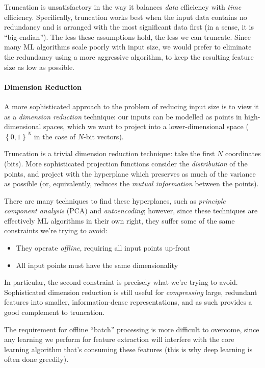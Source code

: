 \documentclass[]{article}
\begin{document}
Truncation is unsatisfactory in the way it balances \emph{data} efficiency with \emph{time} efficiency. Specifically, truncation works best when the input data contains no redundancy and is arranged with the most significant data first (in a sense, it is ``big-endian''). The less these assumptions hold, the less we can truncate. Since many ML algorithms scale poorly with input size, we would prefer to eliminate the redundancy using a more aggressive algorithm, to keep the resulting feature size as low as possible.

\paragraph{Dimension Reduction}

A more sophisticated approach to the problem of reducing input size is to view it as a \emph{dimension reduction} technique: our inputs can be modelled as points in high-dimensional spaces, which we want to project into a lower-dimensional space ($\left\{ {0, 1} \right\}^N$ in the case of $N$-bit vectors).

Truncation is a trivial dimension reduction technique: take the first $N$ coordinates (bits). More sophisticated projection functions consider the \emph{distribution} of the points, and project with the hyperplane which preserves as much of the variance as possible (or, equivalently, reduces the \emph{mutual information} between the points).

There are many techniques to find these hyperplanes, such as \emph{principle component analysis} (PCA) and \emph{autoencoding}; however, since these techniques are effectively ML algorithms in their own right, they suffer some of the same constraints we're trying to avoid:

\begin{itemize}
  \item They operate \emph{offline}, requiring all input points up-front
  \item All input points must have the same dimensionality
\end{itemize}

In particular, the second constraint is precisely what we're trying to avoid. Sophisticated dimension reduction is still useful for \emph{compressing} large, redundant features into smaller, information-dense representations, and as such provides a good complement to truncation.

The requirement for offline ``batch'' processing is more difficult to overcome, since any learning we perform for feature extraction will interfere with the core learning algorithm that's consuming these features (this is why deep learning is often done greedily).
\end{document}
